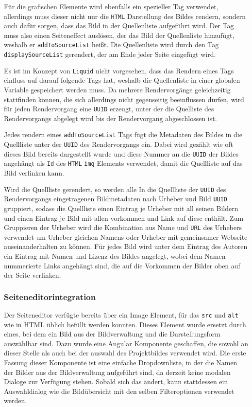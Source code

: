 Für die grafischen Elemente wird ebenfalls ein spezieller Tag verwendet,
allerdings muss dieser nicht nur die \texttt{HTML} Darstellung des Bildes
rendern, sondern auch dafür sorgen, dass das Bild in der Quellenliste aufgeführt
wird. Der Tag muss also einen Seiteneffect auslösen, der das Bild der
Quellenliste hinzufügt, weshalb er \texttt{addToSourceList} heißt. Die
Quellenliste wird durch den Tag \texttt{displaySourceList} gerendert, der am
Ende jeder Seite eingefügt wird.

Es ist im Konzept von \texttt{Liquid} nicht vorgesehen, dass das Rendern eines
Tags einfluss auf darauf folgende Tags hat, weshalb die Quellenliste in einer
globalen Variable gespeichert werden muss. Da mehrere Rendervorgänge
geleichzeitig stattfinden können, die sich allerdings nicht gegenseitig
beeinflussen dürfen, wird für jeden Rendervorgang eine \texttt{UUID} erzeugt,
unter der die Quelliste des Rendervorgangs abgelegt wird bis der Rendervorgang
abgeschlossen ist.

Jedes rendern eines \texttt{addToSourceList} Tags fügt die Metadaten des Bildes
in die Quellliste unter der \texttt{UUID} des Rendervorgangs ein. Dabei wird
gezählt wie oft dieses Bild bereits dargestellt wurde und diese Nummer an die
\texttt{UUID} der Bildes angehängt als \texttt{Id} des \texttt{HTML}
\texttt{img} Elements verwendet, damit die Quellliste auf das Bild verlinken
kann.

Wird die Quellliste gerendert, so werden alle In die Quellliste der
\texttt{UUID} des Rendervorgangs eingetragenen Bildmetadaten nach Urheber und
Bild \texttt{UUID} gruppiert, sodass die Quellliste einen Eintrag je Urheber mit
all seinen Bildern und einen Eintrag je Bild mit allen vorkommen und Link auf
diese enthält. Zum Gruppieren der Urheber wird die Kombination aus Name und
\texttt{URL} des Urhebers verwendet um Urheber gleichen Namens oder Urheber mit
gemeinsamer Webseite auseinanderhalten zu können. Für jedes Bild wird unter dem
Eintrag des Autoren ein Eintrag mit Namen und Lizenz des Bildes angelegt, wobei
dem Namen nummerierte Links angehängt sind, die auf die Vorkommen der Bilder
oben auf der Seite verlinken.

\subsubsection{Seiteneditorintegration}
\label{subsec:4-page-editor}

Der Seiteneditor verfügte bereits über ein Image Element, für das \texttt{src}
und \texttt{alt} wie in HTML üblich befüllt werden konnten. Dieses Element wurde
ersetzt durch eines, bei dem ein Bild aus der Bildverwaltung und die
Darstellungsform auswählbar sind. Dazu wurde eine Angular Komponente geschaffen,
die sowohl an dieser Stelle als auch bei der auswahl des Projektbildes verwendet
wird. Die erste Fassung dieser Komponente ist eine einfache Dropdownliste, in
der die Namen der Bilder aus der Bildverwaltung aufgeführt sind, da derzeit
keine modalen Dialoge zur Verfügung stehen. Sobald sich das ändert, kann
stattdessen ein Auswahldialog wie die Bildübersicht mit den selben
Filteroptionen verwendet werden.

